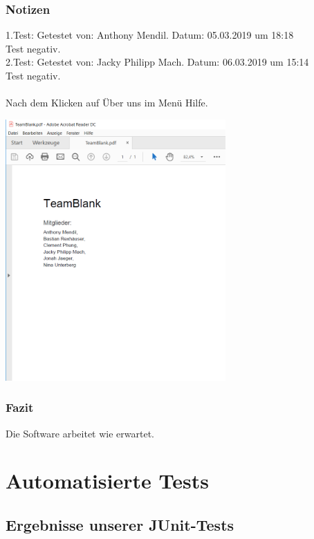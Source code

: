 \documentclass[enabledeprecatedfontcommands]{scrartcl}
\begin{document}
\subsubsection{Notizen}
1.Test: Getestet von: Anthony Mendil. Datum:  05.03.2019 um 18:18\\
Test negativ.\\
2.Test: Getestet von: Jacky Philipp Mach. Datum: 06.03.2019 um 15:14\\
Test negativ.\\\\
Nach dem Klicken auf Über uns im Menü Hilfe.
\begin{center}
\includegraphics[height=10cm]{aboutus.png}
\end{center}
\subsubsection{Fazit}
Die Software arbeitet wie erwartet.
\newpage
\section{Automatisierte Tests}
\subsection{Ergebnisse unserer JUnit-Tests}
\end{document}
